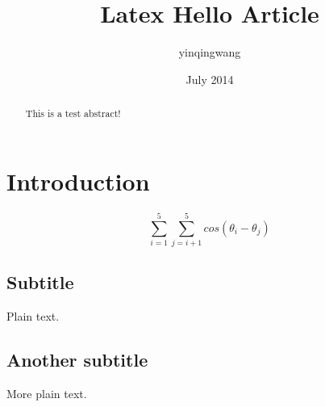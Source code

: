 \documentclass[a4paper]{article}
\title{Latex Hello Article}
\author{yinqingwang }
\date{July 2014}
\begin{document}
\maketitle
\tableofcontents

\begin{abstract}
	This is a test abstract!
	
\end{abstract}

\section{Introduction}

$$\sum_{i=1}^{5}\sum_{j=i+1}^{5}cos(\theta_i-\theta_j)$$ 

\subsection{Subtitle}

Plain text.

\subsection{Another subtitle}

More plain text.
\end{document}

